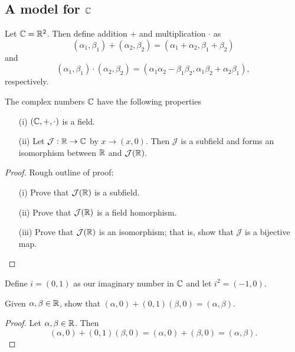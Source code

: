 \documentclass[a4paper]{report}
\begin{document}
\subsection{A model for \( \mathbb{C}  \)}

Let \( \mathbb{C} = \mathbb{R}^{2} \). Then define addition \( +  \) and multiplication \( \cdot \) as 
\[  ({\alpha}_{1}, {\beta}_{1}) + ({\alpha}_{2}, {\beta}_{2}) = ({\alpha}_{1} + {\alpha}_{2}, {\beta}_{1} + {\beta}_{2}) \]
and 
\[  ({\alpha}_{1}, {\beta}_{1}) \cdot ({\alpha}_{2}, {\beta}_{2}) = ({\alpha}_{1} {\alpha}_{2} - {\beta}_{1} {\beta}_{2} , {\alpha}_{1} {\beta}_{2} + {\alpha}_{2} {\beta}_{1}), \]
respectively.


\begin{lemma} The complex numbers \( \mathbb{C}  \) have the following properties
    \begin{enumerate}
        \item[(i)] \( (\mathbb{C}, +, \cdot) \) is a field.
        \item[(ii)] Let \( \mathcal{J}: \mathbb{R} \to \mathbb{C}  \) by \( x \to (x,0) \). Then \( \mathcal{J}  \) is a subfield and forms an isomorphism between \( \mathbb{R}  \) and \( \mathcal{J}(\mathbb{R} ) \).
    \end{enumerate}
\end{lemma}

\begin{proof}
Rough outline of proof:
\begin{enumerate}
    \item[(i)] Prove that \( \mathcal{J}(\mathbb{R} ) \) is a subfield.
    \item[(ii)] Prove that \( \mathcal{J}(\mathbb{R}) \) is a field homorphism.
    \item[(iii)] Prove that \( \mathcal{J}(\mathbb{R}) \) is an isomorphism; that is, show that \( \mathcal{J} \) is a bijective map.
\end{enumerate}
\end{proof}

\begin{definition}[Constructing a solution for \( x^2 + 1 = 0  \)]
   Define \( i = (0,1) \) as our imaginary number in \( \mathbb{C}  \) and let \( i^{2} = (-1,0) \). 
\end{definition}


\begin{prop}
    Given \( \alpha, \beta \in \mathbb{R}  \), show that \( (\alpha, 0 ) + (0,1)(\beta, 0) = (\alpha, \beta) \). 
\end{prop}
\begin{proof}
    Let \( \alpha, \beta \in \mathbb{R}  \). Then
    \[ (\alpha, 0 ) + (0,1)(\beta, 0) = (\alpha, 0) + (\beta, 0) = (\alpha, \beta).  \]
\end{proof}
\end{document}

